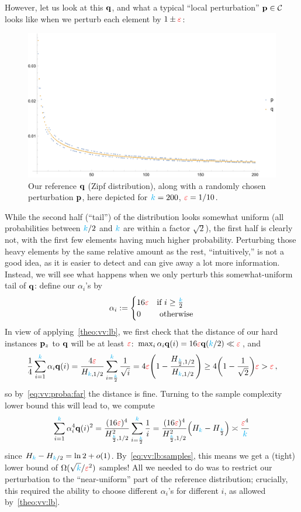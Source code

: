 However, let us look at this $\mathbf{q}$, and what a typical ``local perturbation'' $\mathbf{p}\in\mathcal{C}$ looks like when we perturb each element by $1\pm\textcolor{red}{\varepsilon}$:
\begin{figure}[H]
	\includegraphics[width=1.0\textwidth]{figures/fig-lowerbound-zipf-pq}
	\caption{\label{fig:vv17:lb:zipf}Our reference $\mathbf{q}$ (Zipf distribution), along with a randomly chosen perturbation $\mathbf{p}$, here depicted for ${\textcolor{cyan}{k}}=200$, $\textcolor{red}{\varepsilon}=1/10$.}
\end{figure}
While the second half (``tail'') of the distribution looks somewhat uniform (all probabilities between ${\textcolor{cyan}{k}}/2$ and ${\textcolor{cyan}{k}}$ are within a factor $\sqrt{2}$), the first half is clearly not, with the first few elements having much higher probability. Perturbing those heavy elements by the same relative amount as the rest, ``intuitively,'' is not a good idea, as it is easier to detect and can give away a lot more information. Instead, we will see what happens when we only perturb this somewhat-uniform tail of $\mathbf{q}$: define our $\alpha_i$'s by
\[
	\alpha_i := 
	\begin{cases}
		16\textcolor{red}{\varepsilon} &\text{if } i \geq \frac{{\textcolor{cyan}{k}}}{2}\\
		0 &\text{ otherwise}
	\end{cases}
\]
In view of applying~\cref{theo:vv:lb}, we first check that the distance of our hard instances $\mathbf{p}_z$ to $\mathbf{q}$ will be at least $\textcolor{red}{\varepsilon}$:
$
\max_{i} \alpha_i\mathbf{q}(i) = 16\textcolor{red}{\varepsilon}\mathbf{q}({\textcolor{cyan}{k}}/2) \ll \textcolor{red}{\varepsilon}
$, and
\[
	\frac{1}{4}\sum_{i=1}^\ab \alpha_i\q(i) = 	\frac{4\dst}{H_{\ab,1/2}} \sum_{i=\frac{\ab}{2}}^\ab \frac{1}{\sqrt{i}} = 4\dst\Paren{1-\frac{H_{\frac{\ab}{2},1/2}}{H_{\ab,1/2}}} \geq 4\Paren{1-\frac{1}{\sqrt{2}}}\dst > \dst\,,
\]
so by~\cref{eq:vv:proba:far} the distance is fine. Turning to the sample complexity lower bound this will lead to, we compute
\[
	\sum_{i=1}^\ab \alpha_i^4 \q(i)^2 = \frac{(16\dst)^4}{H_{\frac{\ab}{2},1/2}^2}\sum_{i=\frac{\ab}{2}}^\ab \frac{1}{i} 
	= \frac{(16\dst)^4}{H_{\frac{\ab}{2},1/2}^2} \Paren{ H_{\ab} - H_{\frac{\ab}{2}} }
	\asymp \frac{\dst^4}{\ab}
\] 
since $H_{{\textcolor{cyan}{k}}} - H_{{\textcolor{cyan}{k}}/2} = \ln 2 + o(1)$. By~\cref{eq:vv:lb:samples}, this means we get a (tight) lower bound of $\Omega(\sqrt{{\textcolor{cyan}{k}}}/\textcolor{red}{\varepsilon}^2)$ samples! All we needed to do was to restrict our perturbation to the ``near-uniform'' part of the reference distribution; crucially, this required the ability to choose different $\alpha_i$'s for different $i$, as allowed by~\cref{theo:vv:lb}.\medskip

